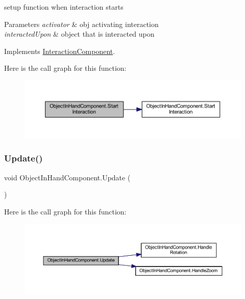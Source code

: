setup function when interaction starts 


\begin{DoxyParams}{Parameters}
{\em activator} & obj activating interaction\\
\hline
{\em interacted\+Upon} & object that is interacted upon\\
\hline
\end{DoxyParams}


Implements \mbox{\hyperlink{class_interaction_component_a80d4c2288af453dd9611bbea092843e5}{Interaction\+Component}}.

Here is the call graph for this function\+:
\nopagebreak
\begin{figure}[H]
\begin{center}
\leavevmode
\includegraphics[width=350pt]{class_object_in_hand_component_aed115a3a0f70c23370cab4428454025c_cgraph}
\end{center}
\end{figure}
\mbox{\label{class_object_in_hand_component_aa3e0ef83a3a10b498b95eb07a405b0e9}} 
\subsubsection{\texorpdfstring{Update()}{Update()}}
{\footnotesize\ttfamily void Object\+In\+Hand\+Component.\+Update (\begin{DoxyParamCaption}{ }\end{DoxyParamCaption})\hspace{0.3cm}{\ttfamily [private]}}

Here is the call graph for this function\+:
\nopagebreak
\begin{figure}[H]
\begin{center}
\leavevmode
\includegraphics[width=350pt]{class_object_in_hand_component_aa3e0ef83a3a10b498b95eb07a405b0e9_cgraph}
\end{center}
\end{figure}


